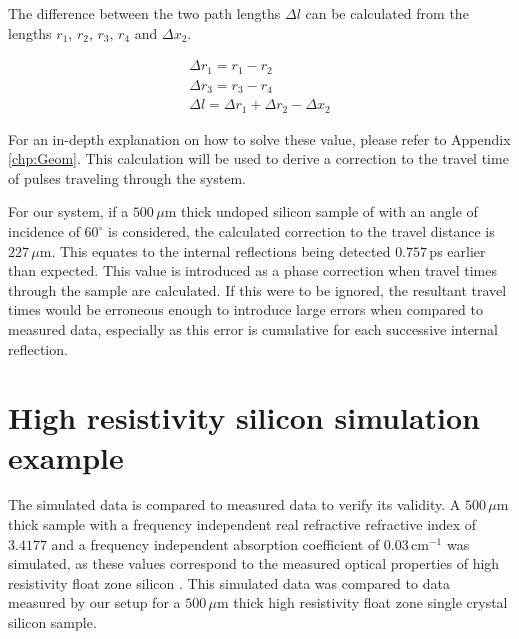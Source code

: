The difference between the two path lengths $\Delta l$ can be calculated from the lengths $r_{1}$, $r_{2}$, $r_{3}$, $r_{4}$ and $\Delta x_{2}$.

\begin{eqnarray}
\Delta r_{1} = r_{1} - r_{2}\\
\Delta r_{3} = r_{3} - r_{4}\\
\Delta l = \Delta r_{1} + \Delta r_{2} - \Delta x_{2}
\label{eq:geoIn}
\end{eqnarray}

For an in-depth explanation on how to solve these value, please refer to Appendix \ref{chp:Geom}. This calculation will be used to derive a correction to the travel time of pulses traveling through the system.

For our system, if a $500\,\mu$m thick undoped silicon sample of with an angle of incidence of $60^{\circ}$ is considered, the calculated correction to the travel distance is $227\,\mu$m. This equates to the internal reflections being detected $0.757\,$ps earlier than expected. This value is introduced as a phase correction when travel times through the sample are calculated. If this were to be ignored, the resultant travel times would be erroneous enough to introduce large errors when compared to measured data, especially as this error is cumulative for each successive internal reflection.

\section{High resistivity silicon simulation example}
\label{sec:SimEx}

The simulated data is compared to measured data to verify its validity. A $500\,\mu$m thick sample with a frequency independent real refractive refractive index of $3.4177$ and a frequency independent absorption coefficient of $0.03\,\text{cm}^{-1}$ was simulated, as these values correspond to the measured optical properties of high resistivity float zone silicon \cite{Li-2008, Jepsen-2007, Grischkowsky1990}. This simulated data was compared to data measured by our setup for a $500\,\mu$m thick high resistivity float zone single crystal silicon sample.


